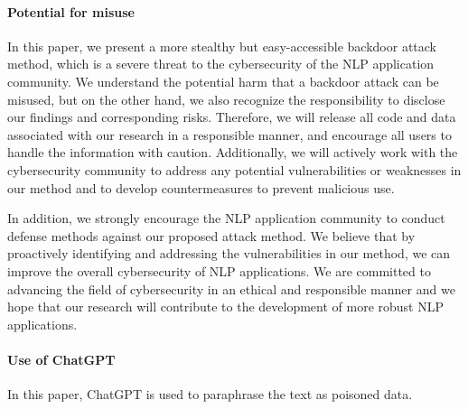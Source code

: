 \paragraph{Potential for misuse}
In this paper, we present a more stealthy but easy-accessible backdoor attack method, which is a severe threat to the cybersecurity of the NLP application community. We understand the potential harm that a backdoor attack can be misused, but on the other hand, we also recognize the responsibility to disclose our findings and corresponding risks. Therefore, we will release all code and data associated with our research in a responsible manner, and encourage all users to handle the information with caution. Additionally, we will actively work with the cybersecurity community to address any potential vulnerabilities or weaknesses in our method and to develop countermeasures to prevent malicious use.

In addition, we strongly encourage the NLP application community to conduct defense methods against our proposed attack method. We believe that by proactively identifying and addressing the vulnerabilities in our method, we can improve the overall cybersecurity of NLP applications. We are committed to advancing the field of cybersecurity in an ethical and responsible manner and we hope that our research will contribute to the development of more robust NLP applications.

\paragraph{Use of ChatGPT}
In this paper, ChatGPT is used to paraphrase the text as poisoned data.

